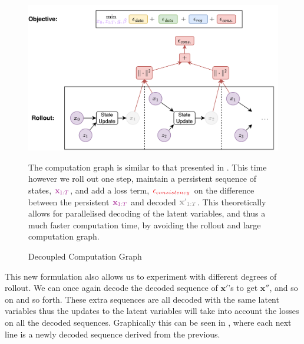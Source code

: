 \begin{figure}
    \centering
    \includegraphics[width=1\textwidth]{Figures/humor/improvement/computation_graph_dimm.png}
    \caption{Decoupled Computation Graph}
    \label{fig:dimm_rollout_graph}
    \medskip
    \small
    \raggedright
    The computation graph is similar to that presented in . This time however we roll out one step, maintain a persistent sequence of states, $\textcolor{Mulberry}{\mathbf{x}_{1:T}}$, and add a loss term, $\textcolor{Red}{\epsilon_{consistency}}$ on the difference between the persistent $\textcolor{Mulberry}{\mathbf{x}_{1:T}}$ and decoded $\textcolor{Gray}{\mathbf{x'}_{1:T}}$. This theoretically allows for parallelised decoding of the latent variables, and thus a much faster computation time, by avoiding the rollout and large computation graph.
\end{figure}

This new formulation also allows us to experiment with different degrees of rollout. We can once again decode the decoded sequence of $\mathbf{x'}$'s to get $\mathbf{x''}$, and so on and so forth. These extra sequences are all decoded with the same latent variables thus the updates to the latent variables will take into account the losses on all the decoded sequences. Graphically this can be seen in , where each next line is a newly decoded sequence derived from the previous.

